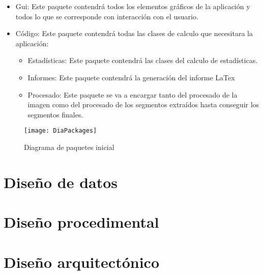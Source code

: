\begin{itemize}
\item Gui:
Este paquete contendrá todos los elementos gráficos de la aplicación y todos lo que se corresponde con interacción con el usuario.
\item Código: Este paquete contendrá todas las clases de calculo que necesitara la aplicación:
	\begin{itemize}
	\item Estadísticas:
	Este paquete contendrá las clases del calculo de estadísticas.
	\item Informes:
	Este paquete contendrá la generación del informe LaTex
	\item Procesado:
	Este paquete se va a encargar tanto del procesado de la imagen 			como del procesado de los segmentos extraídos hasta conseguir los 		segmentos finales.
	\end{itemize}
\end{itemize}

\begin{figure}[h]
	\centering
	\texttt{[image: DiaPackages]}
	\caption{Diagrama de paquetes inicial}
	\label{fig:C.1.2}
\end{figure}


\section{Diseño de datos}

\section{Diseño procedimental}

\section{Diseño arquitectónico}


